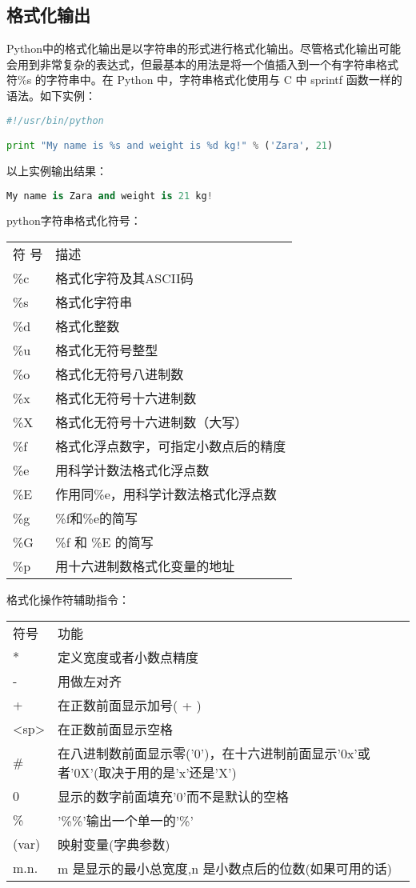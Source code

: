 \subsection{格式化输出}
Python中的格式化输出是以字符串的形式进行格式化输出。尽管格式化输出可能会用到非常复杂的表达式，但最基本的用法是将一个值插入到一个有字符串格式符\%s 的字符串中。在 Python 中，字符串格式化使用与 C 中 sprintf 函数一样的语法。如下实例：
\begin{lstlisting}[language=Python]
#!/usr/bin/python

print "My name is %s and weight is %d kg!" % ('Zara', 21) 
\end{lstlisting}
以上实例输出结果：
\begin{lstlisting}[language=Python]
My name is Zara and weight is 21 kg!
\end{lstlisting}

python字符串格式化符号：

\begin{tabular}{l|l}
符   号	& 描述\\
      \%c	& 格式化字符及其ASCII码\\
      \%s	& 格式化字符串\\
      \%d	& 格式化整数\\
      \%u	& 格式化无符号整型\\
      \%o	& 格式化无符号八进制数\\
      \%x	& 格式化无符号十六进制数\\
      \%X	& 格式化无符号十六进制数（大写）\\
      \%f	& 格式化浮点数字，可指定小数点后的精度\\
      \%e	& 用科学计数法格式化浮点数\\
      \%E	& 作用同\%e，用科学计数法格式化浮点数\\
      \%g	& \%f和\%e的简写\\
      \%G	& \%f 和 \%E 的简写\\
      \%p	& 用十六进制数格式化变量的地址
\end{tabular}

格式化操作符辅助指令：

\begin{tabular}{l|l}
符号&	功能\\
*	&定义宽度或者小数点精度\\
-	&用做左对齐\\
+	&在正数前面显示加号( + )\\
<sp>&	在正数前面显示空格\\
\#	&在八进制数前面显示零('0')，在十六进制前面显示'0x'或者'0X'(取决于用的是'x'还是'X')\\
0	&显示的数字前面填充'0'而不是默认的空格\\
\%	& '\%\%'输出一个单一的'\%'\\
(var)	&映射变量(字典参数)\\
m.n.	&m 是显示的最小总宽度,n 是小数点后的位数(如果可用的话)
\end{tabular}



